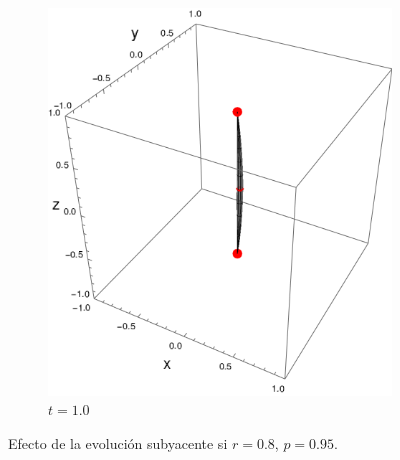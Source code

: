 \begin{figure}[h!]
\begin{subfigure}{0.45\textwidth}
      \includegraphics[width=0.9\linewidth]{maxent/figures/sphere_CNOT_t=1.0_z=0.8_p=0.95.png}
      \caption{$t=1.0$}
    \end{subfigure}
    \caption{Efecto de la evolución subyacente si $r=0.8$, $p=0.95$.}
    \label{fig:CNOTsequence2}
\end{figure}

